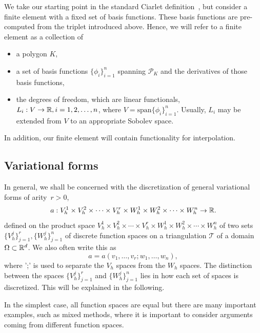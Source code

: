 We take our starting point in the standard Ciarlet
definition~\cite{Cia78}, but consider a finite element with a fixed
set of basis functions.  These basis functions are pre-computed from
the triplet introduced above. Hence, we will refer to a finite
element as a collection of
\begin{itemize}
\item a polygon $K$,
\item a set of basis functions $\{\phi_i\}_{i=1}^n$ spanning
$\mathcal{P}_K$ and the derivatives of those basis functions,
\item the degrees of freedom, which are linear functionals, $L_i : V
\rightarrow \mathbb{R}, i = 1, 2, \ldots, n$, where $V =
\mathrm{span}\{\phi_i\}_{i=1}^n$. Usually, $L_i$ may be extended from
$V$ to an appropriate Sobolev space.
\end{itemize}
In addition, our finite element will contain functionality
for interpolation. 

\subsection{Variational forms}

In general, we shall be concerned with the discretization of general
variational forms of arity~$r > 0$,
\begin{equation} \label{eq:variationalform}
  a : V_h^1 \times V_h^2 \times \cdots \times V_h^r \times
  W_h^1 \times W_h^2 \times \cdots \times W_h^n \rightarrow \mathbb{R}.
\end{equation}
defined on the product space $V_h^1 \times V_h^2 \times \cdots \times
V_h^r \times W_h^1 \times W_h^2 \times \cdots \times W_h^n$ of two sets
$\{V_h^j\}_{j=1}^r, \{W_h^j\}_{j=1}^n$ of discrete function spaces on
a triangulation $\mathcal{T}$ of a domain $\Omega \subset \mathbb{R}^d$. 
We also often write this as 
\begin{equation}
a = a(v_1, \ldots, v_r; w_1, \ldots, w_n), 
\end{equation}
where ';' is used to separate the $V_h$ spaces from the $W_h$ spaces.
The distinction between the spaces $\{V_h^j\}_{j=1}^r$ and
$\{W_h^j\}_{j=1}^n$ lies in how each set of spaces is
discretized. This will be explained in the following.

In the simplest case, all function spaces are equal but there are many
important examples, such as mixed methods, where it is important to
consider arguments coming from different function spaces.

